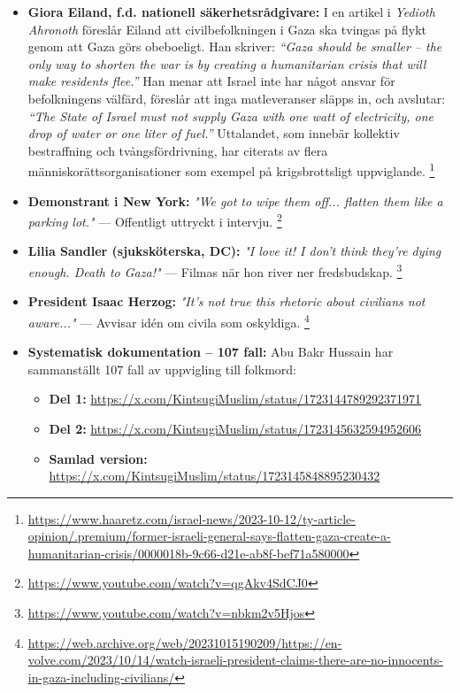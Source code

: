 \begin{itemize}
    \item \textbf{Giora Eiland, f.d. nationell säkerhetsrådgivare:} I en artikel i \textit{Yedioth Ahronoth} föreslår Eiland att civilbefolkningen i Gaza ska tvingas på flykt genom att Gaza görs obeboeligt. Han skriver: \textit{“Gaza should be smaller – the only way to shorten the war is by creating a humanitarian crisis that will make residents flee.”} Han menar att Israel inte har något ansvar för befolkningens välfärd, föreslår att inga matleveranser släpps in, och avslutar: \textit{“The State of Israel must not supply Gaza with one watt of electricity, one drop of water or one liter of fuel.”} Uttalandet, som innebär kollektiv bestraffning och tvångsfördrivning, har citerats av flera människorättsorganisationer som exempel på krigsbrottsligt uppviglande. \footnote{\url{https://www.haaretz.com/israel-news/2023-10-12/ty-article-opinion/.premium/former-israeli-general-says-flatten-gaza-create-a-humanitarian-crisis/0000018b-9c66-d21e-ab8f-bef71a580000}}


    \item \textbf{Demonstrant i New York:} \textit{"We got to wipe them off... flatten them like a parking lot."} — Offentligt uttryckt i intervju. \footnote{\url{https://www.youtube.com/watch?v=qgAkv4SdCJ0}}

    \item \textbf{Lilia Sandler (sjuksköterska, DC):} \textit{"I love it! I don’t think they’re dying enough. Death to Gaza!"} — Filmas när hon river ner fredsbudskap. \footnote{\url{https://www.youtube.com/watch?v=nbkm2v5Hjos}}

    \item \textbf{President Isaac Herzog:} \textit{"It’s not true this rhetoric about civilians not aware..."} — Avvisar idén om civila som oskyldiga. \footnote{\url{https://web.archive.org/web/20231015190209/https://en-volve.com/2023/10/14/watch-israeli-president-claims-there-are-no-innocents-in-gaza-including-civilians/}}

    \item[] \textbf{Systematisk dokumentation – 107 fall:}
    Abu Bakr Hussain har sammanställt 107 fall av uppvigling till folkmord:
    \begin{itemize}
        \item \textbf{Del 1:} \url{https://x.com/KintsugiMuslim/status/1723144789292371971}
        \item \textbf{Del 2:} \url{https://x.com/KintsugiMuslim/status/1723145632594952606}
        \item \textbf{Samlad version:} \url{https://x.com/KintsugiMuslim/status/1723145848895230432}
    \end{itemize}


\end{itemize}
